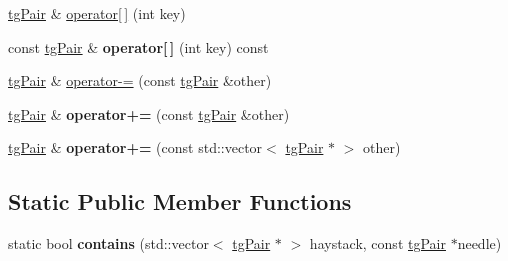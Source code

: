 \begin{DoxyCompactItemize}
\item 
\hyperlink{classtg_pair}{tg\-Pair} \& \hyperlink{classtg_taggables_a6021ba9f018968067c66aea2c595c922}{operator\mbox{[}$\,$\mbox{]}} (int key)
\item 
\hypertarget{classtg_taggables_ad6a35d3c06ea51fdb5c3124057bb85b3}{const \hyperlink{classtg_pair}{tg\-Pair} \& {\bfseries operator\mbox{[}$\,$\mbox{]}} (int key) const}\label{classtg_taggables_ad6a35d3c06ea51fdb5c3124057bb85b3}

\item 
\hyperlink{classtg_pair}{tg\-Pair} \& \hyperlink{classtg_taggables_a312aedd035620cd548def65cf680a0b5}{operator-\/=} (const \hyperlink{classtg_pair}{tg\-Pair} \&other)
\item 
\hypertarget{classtg_taggables_a82b9dee1611abaccf8326d16ab0b68ad}{\hyperlink{classtg_pair}{tg\-Pair} \& {\bfseries operator+=} (const \hyperlink{classtg_pair}{tg\-Pair} \&other)}\label{classtg_taggables_a82b9dee1611abaccf8326d16ab0b68ad}

\item 
\hypertarget{classtg_taggables_a268d114ffe7ca1256c7fcc527dfd0bf7}{\hyperlink{classtg_pair}{tg\-Pair} \& {\bfseries operator+=} (const std\-::vector$<$ \hyperlink{classtg_pair}{tg\-Pair} $\ast$ $>$ other)}\label{classtg_taggables_a268d114ffe7ca1256c7fcc527dfd0bf7}

\end{DoxyCompactItemize}
\subsection*{Static Public Member Functions}
\begin{DoxyCompactItemize}
\item 
\hypertarget{classtg_taggables_ae0c1c79f02a785019b037842b056cac1}{static bool {\bfseries contains} (std\-::vector$<$ \hyperlink{classtg_pair}{tg\-Pair} $\ast$ $>$ haystack, const \hyperlink{classtg_pair}{tg\-Pair} $\ast$needle)}\label{classtg_taggables_ae0c1c79f02a785019b037842b056cac1}

\end{DoxyCompactItemize}
